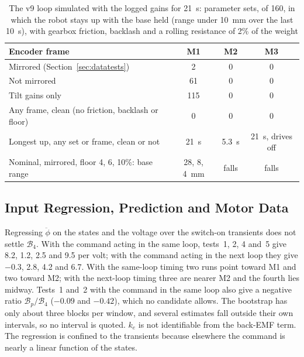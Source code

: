 \begin{table}[htbp]
\centering
\caption{The v9 loop simulated with the logged gains for \SI{21}{s}: parameter
sets, of 160, in which the robot stays up with the base held (range under
\SI{10}{mm} over the last \SI{10}{s}), with gearbox friction, backlash and a
rolling resistance of 2\% of the weight}
\label{tab:v9sim}
\small
\begin{tabular}{lccc}
\toprule
Encoder frame & M1 & M2 & M3 \\
\midrule
Mirrored (Section~\ref{sec:datatests}) & 2 & 0 & 0 \\
Not mirrored & 61 & 0 & 0 \\
Tilt gains only & 115 & 0 & 0 \\
Any frame, clean (no friction, backlash or floor) & 0 & 0 & 0 \\
Longest up, any set or frame, clean or not & \SI{21}{s} & \SI{5.3}{s} & \SI{21}{s}, drives off \\
\midrule
Nominal, mirrored, floor 4, 6, 10\%: base range & 28, 8, \SI{4}{mm} & falls & falls \\
\bottomrule
\end{tabular}
\end{table}

\subsection{Input Regression, Prediction and Motor Data}
\label{sec:predtest}

Regressing $\ddot\phi$ on the states and the voltage over the switch-on
transients does not settle $\mathcal{B}_4$. With the command acting in the same
loop, tests~1, 2, 4 and~5 give 8.2, 1.2, 2.5 and 9.5 per volt; with the command
acting in the next loop they give $-0.3$, 2.8, 4.2 and 6.7. With the
same-loop timing two runs point toward M1 and two toward M2; with the next-loop
timing three are nearer M2 and the fourth lies midway. Tests~1 and~2 with the
command in the same loop also give a negative ratio
$\mathcal{B}_p/\mathcal{B}_4$ ($-0.09$ and $-0.42$), which no candidate
allows. The bootstrap has only about three blocks per window, and several
estimates fall outside their own intervals, so no interval is quoted. $k_e$ is
not identifiable from the back-EMF term. The regression is confined to the
transients because elsewhere the command is nearly a linear function of the
states.

